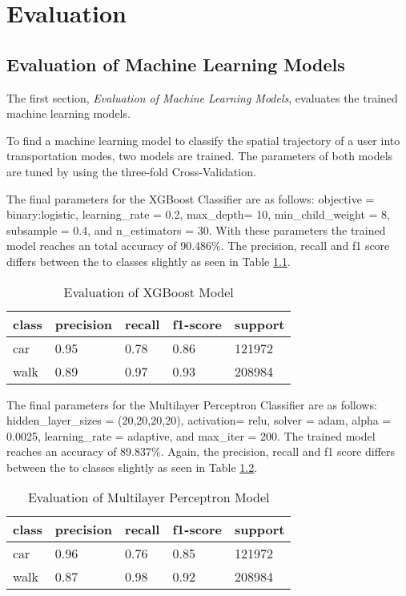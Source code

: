 \chapter{Evaluation}

\section{Evaluation of Machine Learning Models}
The first section, \textit{Evaluation of Machine Learning Models}, evaluates the trained machine learning models.

To find a machine learning model to classify the spatial trajectory of a user into transportation modes, two models are trained. The parameters of both models are tuned by using the three-fold Cross-Validation. 

The final parameters for the XGBoost Classifier are as follows: \linebreak objective = binary:logistic, learning\_rate = 0.2, max\_depth= 10, min\_child\_weight = 8, subsample = 0.4, and n\_estimators = 30. With these parameters the trained model reaches an total accuracy of 90.486\%. The precision, recall and f1 score differs 
between the to classes slightly as seen in Table \ref{table:xgb_eval}. 

\begin{table}[h!]
    \centering
    \begin{tabular}{|l|l|l|l|l|} \toprule
        class & precision & recall & f1-score & support \\ \midrule
        car & 0.95 & 0.78 & 0.86 & 121972 \\
        walk & 0.89 & 0.97 & 0.93 & 208984 \\ \bottomrule 
    \end{tabular}
    \caption{Evaluation of XGBoost Model}
    \label{table:xgb_eval}
\end{table}{}

The final parameters for the Multilayer Perceptron Classifier are as follows: \linebreak hidden\_layer\_sizes =  (20,20,20,20), activation= relu, solver = adam, alpha = 0.0025, learning\_rate = adaptive, and max\_iter = 200. The trained model reaches an accuracy of 89.837\%. Again, the  precision, recall and f1 score differs between the to classes slightly as seen in Table \ref{table:mlp_eval}.

\begin{table}[h!]
    \centering
    \begin{tabular}{|l|l|l|l|l|} \toprule
        class & precision & recall & f1-score & support \\ \midrule
        car & 0.96 & 0.76 & 0.85 & 121972 \\
        walk & 0.87 & 0.98 & 0.92 & 208984 \\ \bottomrule 
    \end{tabular}
    \caption{Evaluation of Multilayer Perceptron Model}
    \label{table:mlp_eval}
\end{table}{}

